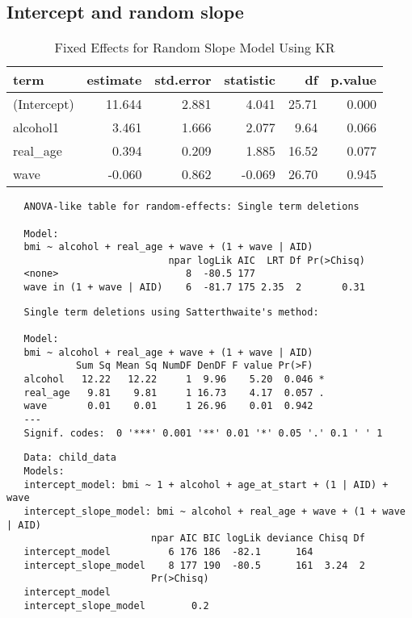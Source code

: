 \documentclass[12pt, twoside]{amherstthesis}
\begin{document}
\hypertarget{intercept-and-random-slope}{%
\subsection{Intercept and random slope}\label{intercept-and-random-slope}}
\begin{table}[H]

\caption{\label{tab:slopekr}Fixed Effects for Random Slope Model Using KR}
\centering
\begin{tabular}[t]{l|r|r|r|r|r}
\hline
term & estimate & std.error & statistic & df & p.value\\
\hline
(Intercept) & 11.644 & 2.881 & 4.041 & 25.71 & 0.000\\
\hline
alcohol1 & 3.461 & 1.666 & 2.077 & 9.64 & 0.066\\
\hline
real\_age & 0.394 & 0.209 & 1.885 & 16.52 & 0.077\\
\hline
wave & -0.060 & 0.862 & -0.069 & 26.70 & 0.945\\
\hline
\end{tabular}
\end{table}
\begin{verbatim}
   ANOVA-like table for random-effects: Single term deletions
   
   Model:
   bmi ~ alcohol + real_age + wave + (1 + wave | AID)
                            npar logLik AIC  LRT Df Pr(>Chisq)
   <none>                      8  -80.5 177                   
   wave in (1 + wave | AID)    6  -81.7 175 2.35  2       0.31
\end{verbatim}
\begin{verbatim}
   Single term deletions using Satterthwaite's method:
   
   Model:
   bmi ~ alcohol + real_age + wave + (1 + wave | AID)
            Sum Sq Mean Sq NumDF DenDF F value Pr(>F)  
   alcohol   12.22   12.22     1  9.96    5.20  0.046 *
   real_age   9.81    9.81     1 16.73    4.17  0.057 .
   wave       0.01    0.01     1 26.96    0.01  0.942  
   ---
   Signif. codes:  0 '***' 0.001 '**' 0.01 '*' 0.05 '.' 0.1 ' ' 1
\end{verbatim}
\begin{verbatim}
   Data: child_data
   Models:
   intercept_model: bmi ~ 1 + alcohol + age_at_start + (1 | AID) + wave
   intercept_slope_model: bmi ~ alcohol + real_age + wave + (1 + wave | AID)
                         npar AIC BIC logLik deviance Chisq Df
   intercept_model          6 176 186  -82.1      164         
   intercept_slope_model    8 177 190  -80.5      161  3.24  2
                         Pr(>Chisq)
   intercept_model                 
   intercept_slope_model        0.2
\end{verbatim}
\end{document}
